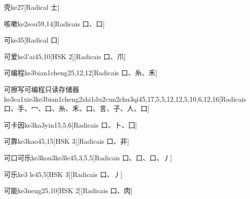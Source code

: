 \begin{entry}{壳}{ke2}{7}[Radical ⼠]
\end{entry}

\begin{entry}{咳嗽}{ke2sou5}{9,14}[Radicais ⼝、⼝]
\end{entry}

\begin{entry}{可}{ke3}{5}[Radical ⼝]
\end{entry}

\begin{entry}{可爱}{ke3'ai4}{5,10}[HSK 2][Radicais ⼝、⽖]
\end{entry}

\begin{entry}{可编程}{ke3bian1cheng2}{5,12,12}[Radicais ⼝、⽷、⽲]
\end{entry}

\begin{entry*}{可擦写可编程只读存储器}{ke3ca1xie3ke3bian1cheng2zhi1du2cun2chu3qi4}{5,17,5,5,12,12,5,10,6,12,16}[Radicais ⼝、⼿、⼍、⼝、⽷、⽲、⼝、⾔、⼦、⼈、⼝]
\end{entry*}

\begin{entry}{可卡因}{ke3ka3yin1}{5,5,6}[Radicais ⼝、⼘、⼞]
\end{entry}

\begin{entry}{可靠}{ke3kao4}{5,15}[HSK 3][Radicais ⼝、⾮]
\end{entry}

\begin{entry}{可口可乐}{ke3kou3ke3le4}{5,3,5,5}[Radicais ⼝、⼝、⼝、⼃]
\end{entry}

\begin{entry}{可乐}{ke3 le4}{5,5}[HSK 3][Radicais ⼝、⼃]
\end{entry}

\begin{entry}{可能}{ke3neng2}{5,10}[HSK 2][Radicais ⼝、⾁]
\end{entry}

